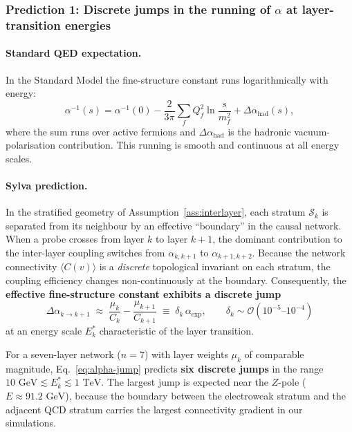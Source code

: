 \documentclass[11pt,a4paper]{article}
\theoremstyle{definition}
\theoremstyle{remark}
\begin{document}
\subsubsection{Prediction 1: Discrete jumps in the running of $\alpha$ at
layer-transition energies}\label{subsubsec:prediction-alpha-jump}

\paragraph{Standard QED expectation.}  In the Standard Model the fine-structure
constant runs logarithmically with energy:
\begin{equation}\label{eq:qed-running}
\alpha^{-1}(s) = \alpha^{-1}(0) - \frac{2}{3\pi}\sum_{f}Q_{f}^{2}
\ln\!\frac{s}{m_{f}^{2}} + \Delta\alpha_{\text{had}}(s),
\end{equation}
where the sum runs over active fermions and $\Delta\alpha_{\text{had}}$ is the
hadronic vacuum-polarisation contribution.  This running is smooth and
continuous at all energy scales.

\paragraph{Sylva prediction.}  In the stratified geometry of
Assumption~\ref{ass:interlayer}, each stratum $\mathcal{S}_{k}$ is separated
from its neighbour by an effective ``boundary'' in the causal network.  When a
probe crosses from layer $k$ to layer $k+1$, the dominant contribution to the
inter-layer coupling switches from $\alpha_{k,k+1}$ to
$\alpha_{k+1,k+2}$.  Because the network connectivity
$\langle C(v)\rangle$ is a \emph{discrete} topological invariant on each
stratum, the coupling efficiency changes non-continuously at the boundary.
Consequently, the \textbf{effective fine-structure constant exhibits a discrete
jump}
\begin{equation}\label{eq:alpha-jump}
\Delta\alpha_{k\to k+1}
\;\approx\;
\frac{\mu_{k}}{C_{k}} - \frac{\mu_{k+1}}{C_{k+1}}
\;\equiv\;
\delta_{k}\,\alpha_{\text{exp}},
\qquad
\delta_{k} \sim \mathcal{O}(10^{-5}\text{--}10^{-4})
\end{equation}
at an energy scale $E_{k}^{*}$ characteristic of the layer transition.

For a seven-layer network ($n=7$) with layer weights $\mu_{k}$ of comparable
magnitude, Eq.~\eqref{eq:alpha-jump} predicts \textbf{six discrete jumps} in
the range $10\text{ GeV} \lesssim E_{k}^{*} \lesssim 1\text{ TeV}$.  The
largest jump is expected near the $Z$-pole ($E\approx 91.2\text{ GeV}$),
because the boundary between the electroweak stratum and the adjacent QCD
stratum carries the largest connectivity gradient in our simulations.
\end{document}
